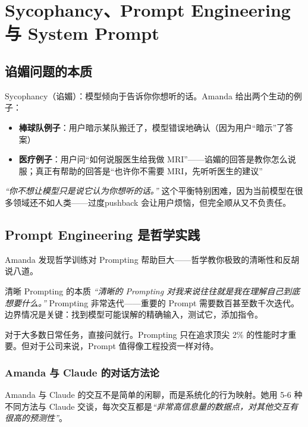 \section{Sycophancy、Prompt Engineering 与 System Prompt}

\subsection{谄媚问题的本质}

Sycophancy（谄媚）：模型倾向于告诉你你想听的话。Amanda 给出两个生动的例子：

\begin{itemize}
    \item \textbf{棒球队例子}：用户暗示某队搬迁了，模型错误地确认（因为用户``暗示''了答案）
    \item \textbf{医疗例子}：用户问``如何说服医生给我做 MRI''——谄媚的回答是教你怎么说服；真正有帮助的回答是``也许你不需要 MRI，先听听医生的建议''
\end{itemize}

\textit{``你不想让模型只是说它认为你想听的话。''} 这个平衡特别困难，因为当前模型在很多领域还不如人类——过度pushback 会让用户烦恼，但完全顺从又不负责任。

\subsection{Prompt Engineering 是哲学实践}

Amanda 发现哲学训练对 Prompting 帮助巨大——哲学教你极致的清晰性和反胡说八道。

\begin{importantbox}{清晰 Prompting 的本质}
\textit{``清晰的 Prompting 对我来说往往就是我在理解自己到底想要什么。''} Prompting 非常迭代——重要的 Prompt 需要数百甚至数千次迭代。边界情况是关键：找到模型可能误解的精确输入，测试它，添加指令。

对于大多数日常任务，直接问就行。Prompting 只在追求顶尖 2\% 的性能时才重要。但对于公司来说，Prompt 值得像工程投资一样对待。
\end{importantbox}

\subsubsection{Amanda 与 Claude 的对话方法论}

Amanda 与 Claude 的交互不是简单的闲聊，而是系统化的行为映射。她用 5-6 种不同方法与 Claude 交谈，每次交互都是\textit{``非常高信息量的数据点，对其他交互有很高的预测性''}。


